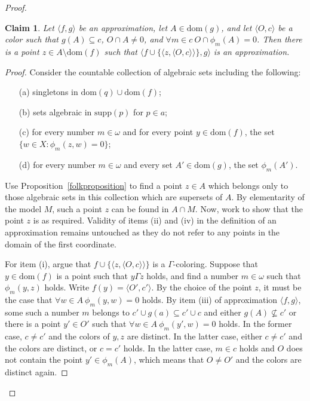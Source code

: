 \documentclass{article}
\newcommand{\gw}{\omega}
\newcommand{\supp}{\mathrm{supp}}
\newcommand{\dom}{\mathrm{dom}}
\newtheorem{claim}[theorem]{Claim}
\theoremstyle{definition}
\begin{document}
\begin{proof}
\begin{claim}
Let $\langle f, g\rangle$ be an approximation, let $A\in\dom(g)$, and let $\langle O, c\rangle$ be a color such that $g(A)\subseteq c$, $O\cap A\neq 0$, and $\forall m\in c\ O\cap\phi_m(A)=0$. Then there is a point $z\in A\setminus\dom(f)$ such that $\langle f\cup\{\langle z, \langle O, c\rangle\rangle\}, g\rangle$ is an approximation.
\end{claim}

\begin{proof}
Consider the countable collection of algebraic sets including the following:

\begin{itemize}
\item[(a)] singletons in $\dom(q)\cup\dom(f)$;
\item[(b)] sets algebraic in $\supp(p)$ for $p\in a$;  
\item[(c)] for every number $m\in\gw$ and for every point $y\in\dom(f)$, the set $\{w\in X\colon \phi_m(z, w)=0\}$;
\item[(d)] for every number $m\in\gw$ and every set $A'\in\dom(g)$, the set $\phi_m(A')$.
\end{itemize}

\noindent Use Proposition~\ref{folkproposition} to find a point $z\in A$ which belongs only to those algebraic sets in this collection which are supersets of $A$. By elementarity of the model $M$, such a point $z$ can be found in $A\cap M$. Now, work to show that the point $z$ is as required. Validity of items (ii) and (iv) in the definition of an approximation remains untouched as they do not refer to any points in the domain of the first coordinate.

For item (i), argue that  $f\cup\{\langle z, \langle O, c\rangle\rangle\}$ is a $\Gamma$-coloring. Suppose that $y\in\dom(f)$ is a point such that $y\Gamma z$ holds, and find a number $m\in\gw$ such that $\phi_m(y, z)$ holds. Write $f(y)=\langle O', c'\rangle$. By the choice of the point $z$, it must be the case that $\forall w\in A\ \phi_m(y, w)=0$ holds. By item (iii) of approximation $\langle f, g\rangle$, some such a number $m$ belongs to $c'\cup g(a)\subseteq c'\cup c$ and either $g(A)\not\subseteq c'$ or there is a point $y'\in O'$ such that $\forall w\in A\ \phi_m(y', w)=0$ holds. In the former case, $c\neq c'$ and the colors of $y, z$ are distinct. In the latter case, either $c\neq c'$ and the colors are distinct, or $c=c'$ holds. In the latter case, $m\in c$ holds and $O$ does not contain the point $y'\in\phi_m(A)$, which means that $O\neq O'$ and the colors are distinct again.


\end{proof}
\end{proof}
\end{document}
